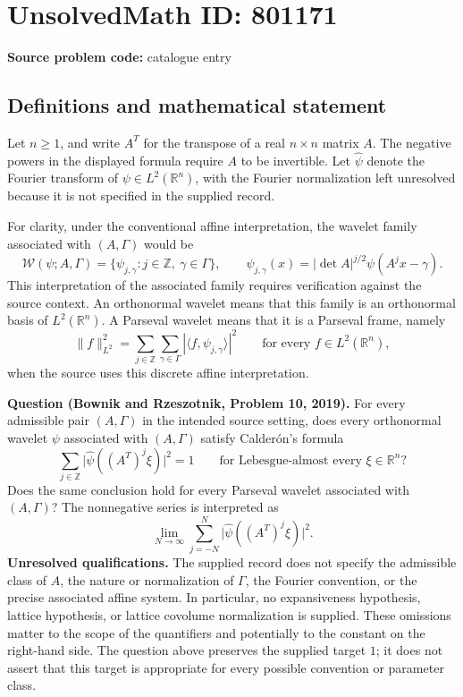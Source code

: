 \documentclass[11pt]{article}
\newcommand{\Z}{\mathbb{Z}}
\newcommand{\R}{\mathbb{R}}
\begin{document}
\section*{UnsolvedMath ID: 801171}
\textbf{Source problem code:} catalogue entry
\subsection{Definitions and mathematical statement}
Let \(n\geq 1\), and write \(A^T\) for the transpose of a real \(n\times n\) matrix \(A\). The negative powers in the displayed formula require \(A\) to be invertible. Let \(\widehat\psi\) denote the Fourier transform of \(\psi\in L^2(\R^n)\), with the Fourier normalization left unresolved because it is not specified in the supplied record.

For clarity, under the conventional affine interpretation, the wavelet family associated with \((A,\Gamma)\) would be
\[
\mathcal W(\psi;A,\Gamma)
=\{\psi_{j,\gamma}:j\in\Z,\ \gamma\in\Gamma\},
\qquad
\psi_{j,\gamma}(x)=|\det A|^{j/2}\psi(A^j x-\gamma).
\]
This interpretation of the associated family requires verification against the source context. An orthonormal wavelet means that this family is an orthonormal basis of \(L^2(\R^n)\). A Parseval wavelet means that it is a Parseval frame, namely
\[
\|f\|_{L^2}^2
=\sum_{j\in\Z}\sum_{\gamma\in\Gamma}
|\langle f,\psi_{j,\gamma}\rangle|^2
\qquad\text{for every }f\in L^2(\R^n),
\]
when the source uses this discrete affine interpretation.

\textbf{Question (Bownik and Rzeszotnik, Problem 10, 2019).}
For every admissible pair \((A,\Gamma)\) in the intended source setting, does every orthonormal wavelet \(\psi\) associated with \((A,\Gamma)\) satisfy Calder\'on's formula
\[
\sum_{j\in\Z}
\bigl|\widehat\psi((A^T)^j\xi)\bigr|^2=1
\qquad\text{for Lebesgue-almost every }\xi\in\R^n?
\]
Does the same conclusion hold for every Parseval wavelet associated with \((A,\Gamma)\)? The nonnegative series is interpreted as
\[
\lim_{N\to\infty}\sum_{j=-N}^{N}
\bigl|\widehat\psi((A^T)^j\xi)\bigr|^2.
\]
\textbf{Unresolved qualifications.} The supplied record does not specify the admissible class of \(A\), the nature or normalization of \(\Gamma\), the Fourier convention, or the precise associated affine system. In particular, no expansiveness hypothesis, lattice hypothesis, or lattice covolume normalization is supplied. These omissions matter to the scope of the quantifiers and potentially to the constant on the right-hand side. The question above preserves the supplied target \(1\); it does not assert that this target is appropriate for every possible convention or parameter class.
\end{document}
